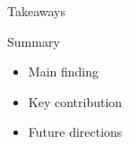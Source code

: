 
\begin{frame}{Takeaways}
	
	\begin{block}{Summary}
		\begin{itemize}
			\item Main finding
			\item Key contribution
			\item Future directions
		\end{itemize}
	\end{block}
	
\end{frame}